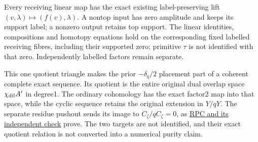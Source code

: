 Every receiving linear map has the exact existing label-preserving lift
\((v,\lambda)\mapsto(f(v),\lambda)\). A nontop input has zero amplitude
and keeps its support label; a nonzero output retains top support. The
linear identities, compositions and homotopy equations hold on the
corresponding fixed labelled receiving fibres, including their supported
zero; primitive \(\tau\) is not identified with that zero. Independently
labelled factors remain separate.

This one quotient triangle makes the prior \(-\delta_q/2\) placement
part of a coherent complete exact sequence. Its quotient is the entire
original dual overlap space \(\chi_{\rm dil}A'\) in degree1. The
ordinary cohomology has the exact factor2 map into that space, while the
cyclic sequence retains the original extension in \(Y/qY\). The separate
residue pushout sends its image to \(C_\zeta/qC_\zeta=0\), as
\href{ACTUAL_RESIDUE_PUSHOUT_INDEPENDENT_CHECK.md}{RPC and its
independent check} prove. The two targets are not identified, and their
exact quotient relation is not converted into a numerical purity claim.
